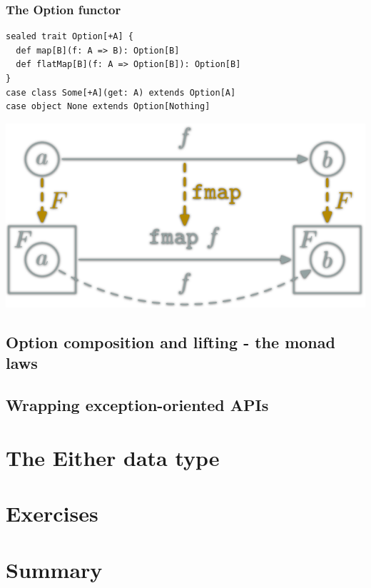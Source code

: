 \documentclass{beamer}
\begin{document}
\begin{frame}[fragile,t]
  \frametitle{The Option functor}
\begin{lstlisting}
sealed trait Option[+A] {
  def map[B](f: A => B): Option[B]
  def flatMap[B](f: A => Option[B]): Option[B]
}
case class Some[+A](get: A) extends Option[A]
case object None extends Option[Nothing]
\end{lstlisting}
  \begin{center}
    \includegraphics[scale=0.20]{boxfunctor.png}
  \end{center}
\end{frame}

\subsection{Option composition and lifting - the monad laws}

\subsection{Wrapping exception-oriented APIs}

\section{The Either data type}

\section{Exercises}

\section{Summary}

\begin{frame}{\secname}
\end{frame}
\end{document}
